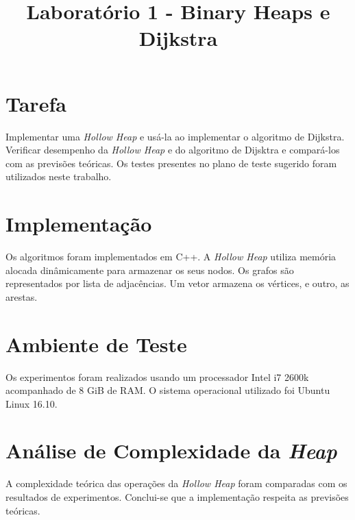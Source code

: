 \documentclass{iiufrgs}
\title{Laboratório 1 - Binary Heaps e Dijkstra}
\author{}{Thiago Bell}
\begin{document}
\maketitle

\setcounter{chapter}{1}

\section{Tarefa}
Implementar uma \textit{Hollow Heap} e usá-la ao implementar o algoritmo de Dijkstra. 
Verificar desempenho da \textit{Hollow Heap} e do algoritmo de Dijsktra e compará-los com as previs\~oes teóricas.
Os testes presentes no plano de teste sugerido foram utilizados neste trabalho.

\section{Implementaç\~ao}
Os algoritmos foram implementados em C++. A \textit{Hollow Heap} utiliza memória alocada dinâmicamente para armazenar os seus nodos.
Os grafos s\~ao representados por lista de adjacências. Um vetor armazena os vértices, e outro, as arestas.

\section{Ambiente de Teste}
Os experimentos foram realizados usando um processador Intel i7 2600k acompanhado de 8 GiB de RAM. 
O sistema operacional utilizado foi Ubuntu Linux 16.10.

\section{Análise de Complexidade da \textit{Heap}}
A complexidade teórica das operaç\~oes da \textit{Hollow Heap} foram comparadas com os resultados de experimentos.
Conclui-se que a implementaç\~ao respeita as previs\~oes teóricas.
\end{document}
